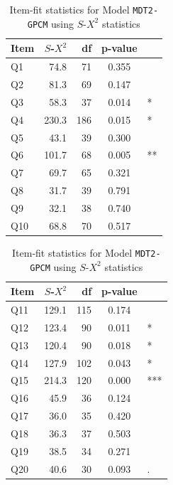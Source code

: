 \documentclass[a4paper]{report}
\begin{document}
\begin{table}[H]
  \begin{minipage}{0.5\linewidth}
    \centering
    \begin{tabular}{lrrcl}
      \hline
      Item & $S$-$X^2$ & df & p-value & \\ 
      \hline
    Q1 & 74.8 & 71 & 0.355 &  \\ 
      Q2 & 81.3 & 69 & 0.147 &  \\ 
      Q3 & 58.3 & 37 & 0.014 & * \\ 
      Q4 & 230.3 & 186 & 0.015 & * \\ 
      Q5 & 43.1 & 39 & 0.300 &  \\ 
      Q6 & 101.7 & 68 & 0.005 & ** \\ 
      Q7 & 69.7 & 65 & 0.321 &  \\ 
      Q8 & 31.7 & 39 & 0.791 &  \\ 
      Q9 & 32.1 & 38 & 0.740 &  \\ 
      Q10 & 68.8 & 70 & 0.517 &  \\ 
       \hline
    \end{tabular}
  \end{minipage}%
  \begin{minipage}{0.5\linewidth}
    \centering
    \begin{tabular}{lrrcl}
      \hline
      Item & $S$-$X^2$ & df & p-value & \\
      \hline
    Q11 & 129.1 & 115 & 0.174 &  \\ 
      Q12 & 123.4 & 90 & 0.011 & * \\ 
      Q13 & 120.4 & 90 & 0.018 & * \\ 
      Q14 & 127.9 & 102 & 0.043 & * \\ 
      Q15 & 214.3 & 120 & 0.000 & *** \\ 
      Q16 & 45.9 & 36 & 0.124 &  \\ 
      Q17 & 36.0 & 35 & 0.420 &  \\ 
      Q18 & 36.3 & 37 & 0.503 &  \\ 
      Q19 & 38.5 & 34 & 0.271 &  \\ 
      Q20 & 40.6 & 30 & 0.093 & . \\ 
       \hline
    \end{tabular}
  \end{minipage}
  \caption{\label{tab:IRT_pre17_GPCM_itemfit}Item-fit statistics for Model \texttt{MDT2-GPCM} using $S\text{-}X^2$ statistics}
\end{table}
\end{document}
